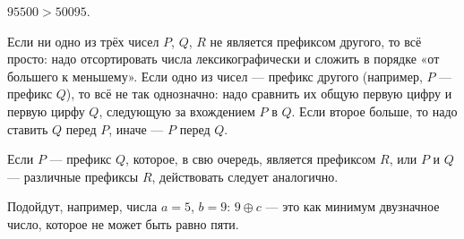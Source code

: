 \begin{itemize}
\itA $95500 > 50095$.

\itB Если ни одно из трёх чисел $P$, $Q$, $R$ не является префиксом другого, то всё просто: надо отсортировать числа лексикографически и сложить в порядке «от большего к меньшему». Если одно из чисел — префикс другого (например, $P$ — префикс $Q$), то всё не так однозначно: надо сравнить их общую первую цифру и первую цирфу $Q$, следующую за вхождением $P$ в $Q$. Если второе больше, то надо ставить $Q$ перед $P$, иначе — $P$ перед $Q$.

\ms Если $P$ — префикс $Q$, которое, в свю очередь, является префиксом $R$, или $P$ и $Q$ — различные префиксы $R$, действовать следует аналогично.

\itC Подойдут, например, числа $a=5$, $b=9$: $9 \oplus c$ — это как минимум двузначное число, которое не может быть равно пяти.
\end{itemize}